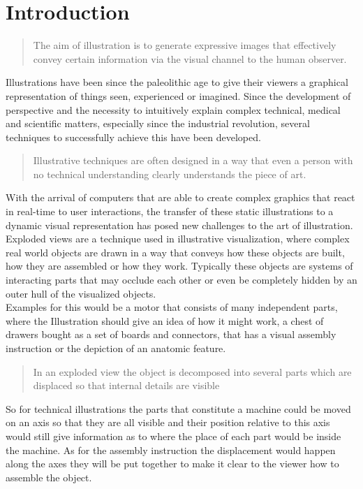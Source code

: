 \chapter{Introduction}

\begin{quote}
The aim of illustration is to generate expressive images that effectively convey certain information via the visual channel to the human observer.
\end{quote}
Illustrations have been since the paleolithic age\cite{Viola-05-Smart} to give their viewers a graphical representation of things seen, experienced or imagined\cite{misc:WikiEnVIs}. Since the development of perspective and the necessity to intuitively explain complex technical, medical and scientific matters, especially since the industrial revolution, several techniques to successfully achieve this have been developed.
\begin{quote}
Illustrative techniques are often designed in a way that even a person with no technical understanding clearly understands the piece of art.\cite{Viola-05-Smart}
\end{quote}
With the arrival of computers that are able to create complex graphics that react in real-time to user interactions, the transfer of these static illustrations to a dynamic visual representation has posed new challenges to the art of illustration.
Exploded views are a technique used in illustrative visualization, where complex real world objects are drawn in a way that conveys how these objects are built, how they are assembled or how they work. Typically these objects are systems of interacting parts that may occlude each other or even be completely hidden by an outer hull of the visualized objects.\\
Examples for this would be a motor that consists of many independent parts, where the Illustration should give an idea of how it might work, a chest of drawers bought as a set of boards and connectors, that has a visual assembly instruction or the depiction of an anatomic feature.\\
\begin{quote}
In an exploded view the object is decomposed into several parts which are displaced so that internal details are visible \cite{proc:bruckner-2006-EVV}
\end{quote}
So for technical illustrations the parts that constitute a machine could be moved on an axis so that they are all visible and their position relative to this axis would still give information as to where the place of each part would be inside the machine. As for the assembly instruction the displacement would happen along the axes they will be put together to make it clear to the viewer how to assemble the object.\\
